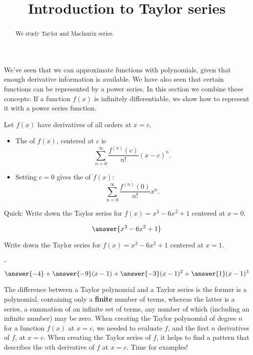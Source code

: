 \documentclass{ximera}
\title[Dig-In:]{Introduction to Taylor series}
\begin{document}
\begin{abstract}
  We study Taylor and Maclaurin series.
\end{abstract}
\maketitle

We've seen that we can approximate functions with polynomials, given
that enough derivative information is available.  We have also seen
that certain functions can be represented by a power series.  In this
section we combine these concepts: If a function $f(x)$ is infinitely
differentiable, we show how to represent it with a power series
function.

\begin{definition}
  Let $f(x)$ have derivatives of all orders at $x=c$.  
  \begin{itemize}
  \item The  of $f(x)$, centered at $c$ is
    \[
    \sum_{n=0}^\infty \frac{f^{(n)}(c)}{n!}(x-c)^n.
    \]
  \item Setting $c=0$ gives the  of $f(x)$:
    \[
    \sum_{n=0}^\infty \frac{f^{(n)}(0)}{n!}x^n.
    \]
  \end{itemize}
\end{definition}

\begin{question}
  Quick: Write down the Taylor series for $f(x) = x^3-6x^2+1$ centered
  at $x=0$.
  \begin{prompt}
    \[
    \answer{x^3-6x^2+1}
    \]
  \end{prompt}
  \begin{question}
    Write down the Taylor series for $f(x) = x^3-6x^2+1$ centered at
    $x=1$.
    \begin{prompt}-
      \[
      \answer{-4} + \answer{-9}(x-1) + \answer{-3}(x-1)^2 + \answer{1}(x-1)^3
      \]
    \end{prompt}
  \end{question}
\end{question}

The difference between a Taylor polynomial and a Taylor series is the
former is a polynomial, containing only a \textbf{finite} number of
terms, whereas the latter is a series, a summation of an infinite set
of terms, any number of which (including an infinite number) may be
zero. When creating the Taylor polynomial of degree $n$ for a function
$f(x)$ at $x=c$, we needed to evaluate $f$, and the first $n$
derivatives of $f$, at $x=c$. When creating the Taylor series of $f$,
it helps to find a pattern that describes the $n$th derivative of $f$
at $x=c$.  Time for examples!
\end{document}
